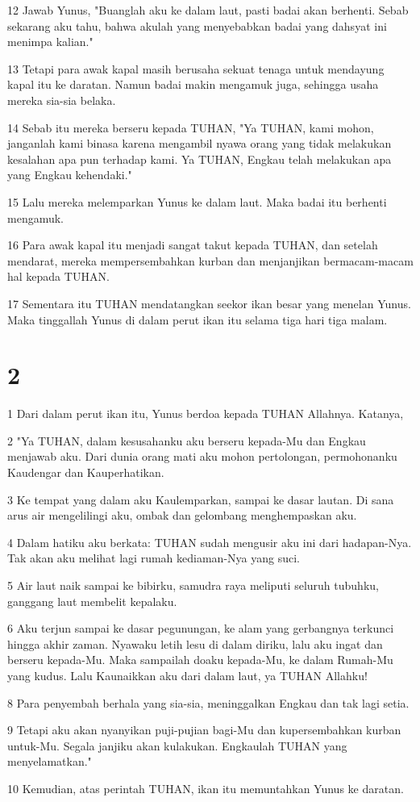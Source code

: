 \par 12 Jawab Yunus, "Buanglah aku ke dalam laut, pasti badai akan berhenti. Sebab sekarang aku tahu, bahwa akulah yang menyebabkan badai yang dahsyat ini menimpa kalian."
\par 13 Tetapi para awak kapal masih berusaha sekuat tenaga untuk mendayung kapal itu ke daratan. Namun badai makin mengamuk juga, sehingga usaha mereka sia-sia belaka.
\par 14 Sebab itu mereka berseru kepada TUHAN, "Ya TUHAN, kami mohon, janganlah kami binasa karena mengambil nyawa orang yang tidak melakukan kesalahan apa pun terhadap kami. Ya TUHAN, Engkau telah melakukan apa yang Engkau kehendaki."
\par 15 Lalu mereka melemparkan Yunus ke dalam laut. Maka badai itu berhenti mengamuk.
\par 16 Para awak kapal itu menjadi sangat takut kepada TUHAN, dan setelah mendarat, mereka mempersembahkan kurban dan menjanjikan bermacam-macam hal kepada TUHAN.
\par 17 Sementara itu TUHAN mendatangkan seekor ikan besar yang menelan Yunus. Maka tinggallah Yunus di dalam perut ikan itu selama tiga hari tiga malam.

\chapter{2}

\par 1 Dari dalam perut ikan itu, Yunus berdoa kepada TUHAN Allahnya. Katanya,
\par 2 "Ya TUHAN, dalam kesusahanku aku berseru kepada-Mu dan Engkau menjawab aku. Dari dunia orang mati aku mohon pertolongan, permohonanku Kaudengar dan Kauperhatikan.
\par 3 Ke tempat yang dalam aku Kaulemparkan, sampai ke dasar lautan. Di sana arus air mengelilingi aku, ombak dan gelombang menghempaskan aku.
\par 4 Dalam hatiku aku berkata: TUHAN sudah mengusir aku ini dari hadapan-Nya. Tak akan aku melihat lagi rumah kediaman-Nya yang suci.
\par 5 Air laut naik sampai ke bibirku, samudra raya meliputi seluruh tubuhku, ganggang laut membelit kepalaku.
\par 6 Aku terjun sampai ke dasar pegunungan, ke alam yang gerbangnya terkunci hingga akhir zaman. Nyawaku letih lesu di dalam diriku, lalu aku ingat dan berseru kepada-Mu. Maka sampailah doaku kepada-Mu, ke dalam Rumah-Mu yang kudus. Lalu Kaunaikkan aku dari dalam laut, ya TUHAN Allahku!
\par 8 Para penyembah berhala yang sia-sia, meninggalkan Engkau dan tak lagi setia.
\par 9 Tetapi aku akan nyanyikan puji-pujian bagi-Mu dan kupersembahkan kurban untuk-Mu. Segala janjiku akan kulakukan. Engkaulah TUHAN yang menyelamatkan."
\par 10 Kemudian, atas perintah TUHAN, ikan itu memuntahkan Yunus ke daratan.

